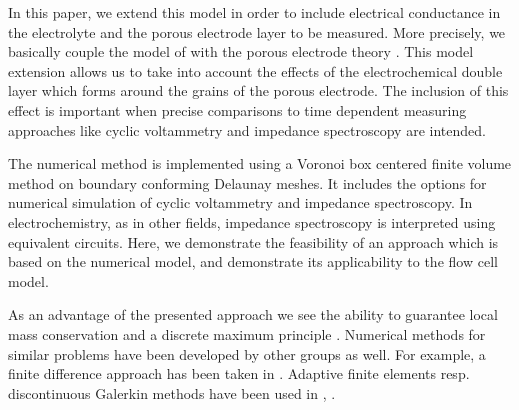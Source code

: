 \documentclass[english,nofirstpagebreak,empty]{amsproc}
\begin{document}
In this  paper, we  extend this model  in order to  include electrical
conductance in  the electrolyte and  the porous electrode layer  to be
measured.   More   precisely,  we   basically  couple  the   model  of
\cite{FuhrmannZhaoHolzbecherLangmach2008}  with  the porous  electrode
theory \cite{Newman+ThomasAlyea-2004}.  This model extension allows us to
take  into account  the effects  of the  electrochemical  double layer
which forms around  the grains of the porous  electrode. The inclusion
of this effect is important when precise comparisons to time dependent
measuring   approaches   like   cyclic   voltammetry   and   impedance
spectroscopy are intended.

The  numerical method  is  implemented using  a  Voronoi box  centered
finite  volume  method on  boundary  conforming  Delaunay meshes.   It
includes the  options for  numerical simulation of  cyclic voltammetry
and impedance spectroscopy.  In  electrochemistry, as in other fields,
impedance  spectroscopy  is  interpreted  using  equivalent  circuits.
Here, we demonstrate the feasibility  of an approach which is based on
the  numerical model, and  demonstrate its  applicability to  the flow
cell model.


As  an advantage  of  the presented  approach  we see  the ability  to
guarantee  local mass  conservation and  a discrete  maximum principle
\cite{EymardFuhrmannGaertner2006}.   Numerical   methods  for  similar
problems have been developed by  other groups as well.  For example, a
finite difference approach  has been taken in \cite{AldenCompton1997}.
Adaptive  finite elements  resp. discontinuous  Galerkin  methods have
been         used         in         \cite{HarrimanGavaghanSueli2004},
\cite{GavaghanGillowSueli2006}.

\end{document}

